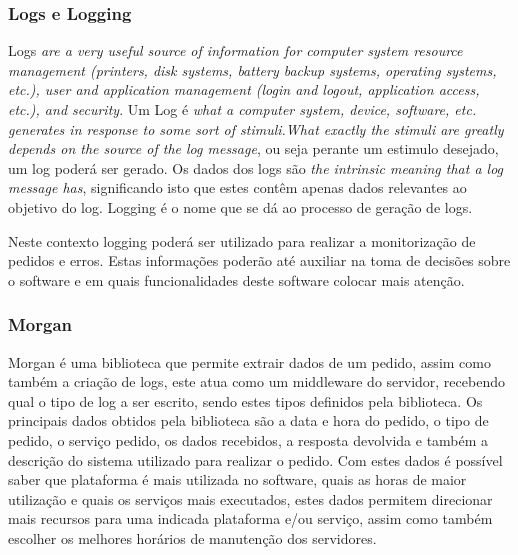 \subsubsection{Logs e Logging}
Logs \emph{are a very useful source of information for computer system resource management (printers, disk systems, battery backup systems, operating systems, etc.), user and application management (login and logout, application access, etc.), and security}\citep{Logging}. Um Log é \emph{what a computer system, device, software, etc. generates in response to some sort of stimuli.What exactly the stimuli are greatly depends on the source of the log message}\citep{Logging}, ou seja perante um estimulo desejado, um log poderá ser gerado. Os dados dos logs são \emph{the intrinsic meaning that a log message has}\citep{Logging}, significando isto que estes contêm apenas dados relevantes ao objetivo do log. Logging é o nome que se dá ao processo de geração de logs.

Neste contexto logging poderá ser utilizado para realizar a monitorização de pedidos e erros. Estas informações poderão até auxiliar na toma de decisões sobre o software e em quais funcionalidades deste software colocar mais atenção.

\subsubsection{Morgan}

Morgan é uma biblioteca que permite extrair dados de um pedido, assim como também a criação de logs, este atua como um middleware do servidor, recebendo qual o tipo de log a ser escrito, sendo estes tipos definidos pela biblioteca. Os principais dados obtidos pela biblioteca são a data e hora do pedido, o tipo de pedido, o serviço pedido, os dados recebidos, a resposta devolvida e também a descrição do sistema utilizado para realizar o pedido. Com estes dados é possível saber que plataforma é mais utilizada no software, quais as horas de maior utilização e quais os serviços mais executados, estes dados permitem direcionar mais recursos para uma indicada plataforma e/ou serviço, assim como também escolher os melhores horários de manutenção dos servidores.